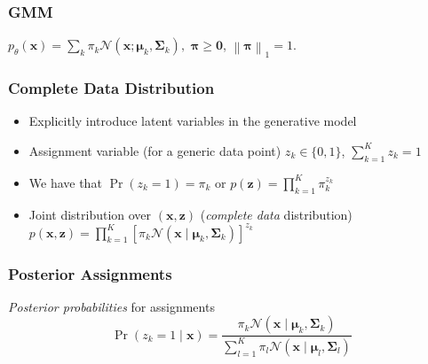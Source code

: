 \documentclass[11pt,a4paper,technote]{IEEEtran}
\newcommand{\norm}[1]{\left\lVert#1\right\rVert}
\newcommand{\matr}[1]{\boldsymbol{\mathbf{#1}}}
\newcommand{\vect}[1]{\boldsymbol{\mathbf{#1}}}
\newcommand{\normal}{\mathcal{N}}
\begin{document}
\subsubsection*{GMM}
\(
  p_{\theta}(\vect{x}) = \sum_{k} \pi_k \normal(\vect{x}; \vect{\mu}_k,
  \matr{\Sigma}_k),
\)
$\vect{\pi}\geq\vect{0}$, $\norm{\vect{\pi}}_1 = 1$.

\subsubsection*{Complete Data Distribution}
\begin{itemize}
  \item Explicitly introduce latent variables in the generative model
  \item Assignment variable (for a generic data point) $z_k \in \{0,1\}$,
    $\sum_{k=1}^K z_k = 1$
  \item We have that $\Pr(z_k = 1) = \pi_k$ or $p(\vect{z}) = \prod_{k=1}^K
    \pi_k^{z_k}$
  \item Joint distribution over $(\vect{x}, \vect{z})$ (\emph{complete data}
    distribution) $p(\vect{x}, \vect{z}) = \prod_{k=1}^K {\left[ \pi_k
        \normal(\vect{x} \mid \vect{\mu}_k, \matr{\Sigma}_k)\right]}^{z_k}$
\end{itemize}

\subsubsection*{Posterior Assignments}
\emph{Posterior probabilities} for assignments
\[
  \Pr(z_k = 1 \mid \vect{x}) = \frac{\pi_k \normal(\vect{x} \mid \vect{\mu}_k,
    \matr{\Sigma}_k)}{\sum_{l=1}^K \pi_l \normal(\vect{x} \mid \vect{\mu}_l,
    \matr{\Sigma}_l)}
\]
\end{document}
